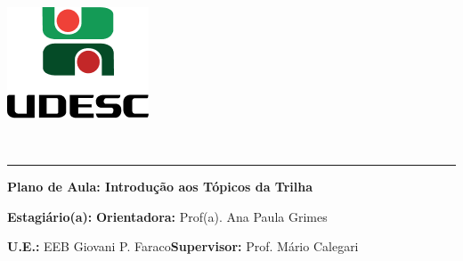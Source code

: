 \documentclass[
12pt,				%
openright,			%
oneside,			%
a4paper,			%
chapter=TITLE,		%
english,			%
brazil				%
]{abntex2}
\begin{document}
\thispagestyle{empty}
\begin{center}
	\begin{minipage}[!]{\linewidth}
		\begin{minipage}[!]{.19\linewidth}
			\includegraphics[width=\linewidth]{img/logo.png}           
		\end{minipage}
		\begin{minipage}[!]{.8\linewidth}
			\center
			\ABNTEXchapterfont\normalsize\MakeUppercase{\imprimirinstituicao}
			\par
			\vspace*{10pt}                     
			\ABNTEXchapterfont\normalsize\MakeUppercase{\centro}
			\par
			\vspace*{10pt}           
			\ABNTEXchapterfont\normalsize\MakeUppercase{\disciplina}
		\end{minipage}        
	\end{minipage}
	\\ \vspace{0.5cm}
	\rule{\textwidth}{.5pt}   
\end{center}
\textual
\begin{center}
	\textbf{Plano de Aula: Introdução aos Tópicos da Trilha}
\end{center}
\par\noindent\textbf{Estagiário(a):} \imprimirautor\hfill{}\textbf{Orientadora:} Prof(a). Ana Paula Grimes
\par\noindent\textbf{U.E.:} EEB Giovani P. Faraco\hfill{}\textbf{Supervisor:} Prof. Mário Calegari
\end{document}
